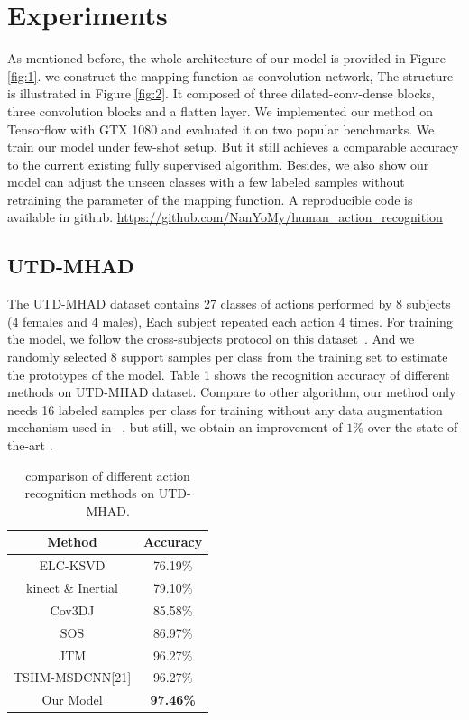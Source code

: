 \documentclass{bmvc2k}
\begin{document}
\section{Experiments}
As mentioned before, the whole architecture of our model is provided in Figure \ref{fig:1}. we construct the mapping function as convolution network, The structure is illustrated in Figure \ref{fig:2}. It composed of three dilated-conv-dense blocks, three convolution blocks and a flatten layer. We implemented our method on Tensorflow with GTX 1080 and evaluated it on two popular benchmarks. We train our model under few-shot setup. But it still achieves a comparable accuracy to the current existing fully supervised algorithm. Besides, we also show our model can adjust the unseen classes with a few labeled samples without retraining the parameter of the mapping function. A reproducible code is available in github. \url{https://github.com/NanYoMy/human_action_recognition}

\subsection*{UTD-MHAD}
The UTD-MHAD dataset contains 27 classes of actions performed by 8 subjects (4 females and 4 males), Each subject repeated each action 4 times. For training the model, we follow the cross-subjects protocol on this dataset~\cite{chen2015utd}. And we randomly selected 8 support samples per class from the training set to estimate the prototypes of the model. Table 1 shows the recognition accuracy of different methods on UTD-MHAD dataset. Compare to other algorithm, our method only needs 16 labeled samples per class for training without any data augmentation mechanism used in ~\cite{pham2017learning,li2017skeleton_2}, but still, we obtain an improvement of $1\%$ over the state-of-the-art .

\begin{table}[htb]
	\begin{center}		
		\begin{tabular}{|c|c|}
			\hline
			Method & Accuracy \\
			\hline\hline
			ELC-KSVD & 76.19\% \\
			kinect \& Inertial & 79.10\% \\
			Cov3DJ & 85.58\%\\
			SOS & 86.97\% \\
			JTM & 96.27\% \\
			TSIIM-MSDCNN[21] & 96.27\% \\
			Our Model & \bf{97.46\%} \\
			\hline
		\end{tabular}	
	\end{center}		
	\caption{ comparison of different action recognition methods on UTD-MHAD.}
	\label{tab:1}
\end{table}
\end{document}
